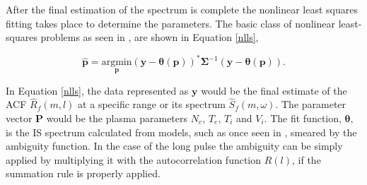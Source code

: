 \documentclass[draft,ras]{agutex}
\begin{document}
\begin{article}
After the final estimation of the spectrum is complete the nonlinear least squares fitting takes place to determine the parameters.  The basic class of nonlinear least-squares problems as seen in \citep{kayvol1}, are shown in Equation \ref{nlls},

\begin{equation}
	\hat{\mathbf{p}}= \underset{\mathbf{p}}{\text{argmin}} (\mathbf{y}-\bm{\theta}(\mathbf{p}))^*\bm{\Sigma}^{-1}(\mathbf{y}-\bm{\theta}(\mathbf{p})).
\label{nlls}
\end{equation}

In Equation \ref{nlls}, the data represented as $\mathbf{y}$ would be the final estimate of the ACF $\hat{R}_f(m,l)$ at a specific range or its spectrum $\hat{S}_f(m,\omega)$. The parameter vector $\mathbf{P}$ would be the plasma parameters $N_e$, $T_e$, $T_i$ and $V_i$. The fit function, $\bm{\theta}$, is the IS spectrum calculated from models, such as once seen in \citep{kudeki:milla:1}, smeared by the ambiguity function. In the case of the long pulse the ambiguity can be simply applied by multiplying it with the autocorrelation function $R(l)$, if the summation rule is properly applied. 

%
%






\end{article}
\end{document}
